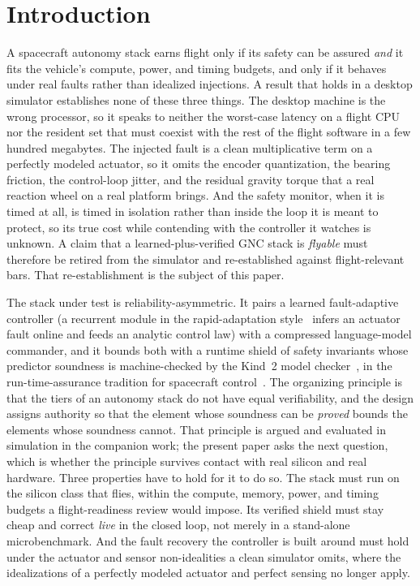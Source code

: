 \documentclass[journal]{IEEEtran}
\begin{document}
\section{Introduction}
A spacecraft autonomy stack earns flight only if its safety can be assured \emph{and} it fits
the vehicle's compute, power, and timing budgets, and only if it behaves under real faults
rather than idealized injections. A result that holds in a desktop simulator establishes none
of these three things. The desktop machine is the wrong processor, so it speaks to neither the
worst-case latency on a flight CPU nor the resident set that must coexist with the rest of the
flight software in a few hundred megabytes. The injected fault is a clean multiplicative term on
a perfectly modeled actuator, so it omits the encoder quantization, the bearing friction, the
control-loop jitter, and the residual gravity torque that a real reaction wheel on a real
platform brings. And the safety monitor, when it is timed at all, is timed in isolation rather
than inside the loop it is meant to protect, so its true cost while contending with the
controller it watches is unknown. A claim that a learned-plus-verified GNC stack is
\emph{flyable} must therefore be retired from the simulator and re-established against
flight-relevant bars. That re-establishment is the subject of this paper.

The stack under test is reliability-asymmetric. It pairs a learned fault-adaptive controller (a
recurrent module in the rapid-adaptation style~\cite{Kumar2021} infers an actuator fault online
and feeds an analytic control law) with a compressed language-model commander, and it bounds
both with a runtime shield of safety invariants whose predictor soundness is machine-checked by
the Kind~2 model checker~\cite{Champion2016}, in the run-time-assurance tradition for spacecraft
control~\cite{Dunlap2023}. The organizing principle is that the tiers of an autonomy stack do
not have equal verifiability, and the design assigns authority so that the element whose
soundness can be \emph{proved} bounds the elements whose soundness cannot. That principle is
argued and evaluated in simulation in the companion work; the present paper asks the next
question, which is whether the principle survives contact with real silicon and real hardware.
Three properties have to hold for it to do so. The stack must run on the silicon class that
flies, within the compute, memory, power, and timing budgets a flight-readiness review would
impose. Its verified shield must stay cheap and correct \emph{live} in the closed loop, not
merely in a stand-alone microbenchmark. And the fault recovery the controller is built around
must hold under the actuator and sensor non-idealities a clean simulator omits, where the
idealizations of a perfectly modeled actuator and perfect sensing no longer apply.
\end{document}
